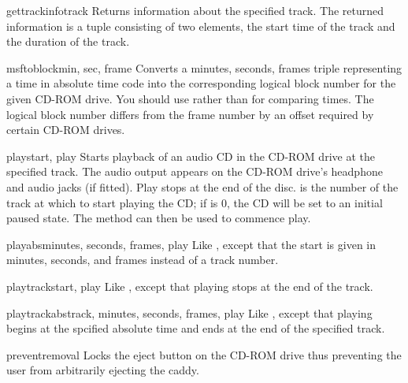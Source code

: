 \begin{methoddesc}[CD player]{gettrackinfo}{track}
Returns information about the specified track.  The returned
information is a tuple consisting of two elements, the start time of
the track and the duration of the track.
\end{methoddesc}

\begin{methoddesc}[CD player]{msftoblock}{min, sec, frame}
Converts a minutes, seconds, frames triple representing a time in
absolute time code into the corresponding logical block number for the
given CD-ROM drive.  You should use  rather than
 for comparing times.  The logical block number
differs from the frame number by an offset required by certain CD-ROM
drives.
\end{methoddesc}

\begin{methoddesc}[CD player]{play}{start, play}
Starts playback of an audio CD in the CD-ROM drive at the specified
track.  The audio output appears on the CD-ROM drive's headphone and
audio jacks (if fitted).  Play stops at the end of the disc.
 is the number of the track at which to start playing the
CD; if  is 0, the CD will be set to an initial paused
state.  The method  can then be used to commence
play.
\end{methoddesc}

\begin{methoddesc}[CD player]{playabs}{minutes, seconds, frames, play}
Like , except that the start is given in minutes,
seconds, and frames instead of a track number.
\end{methoddesc}

\begin{methoddesc}[CD player]{playtrack}{start, play}
Like , except that playing stops at the end of the
track.
\end{methoddesc}

\begin{methoddesc}[CD player]{playtrackabs}{track, minutes, seconds, frames, play}
Like , except that playing begins at the spcified
absolute time and ends at the end of the specified track.
\end{methoddesc}

\begin{methoddesc}[CD player]{preventremoval}{}
Locks the eject button on the CD-ROM drive thus preventing the user
from arbitrarily ejecting the caddy.
\end{methoddesc}

